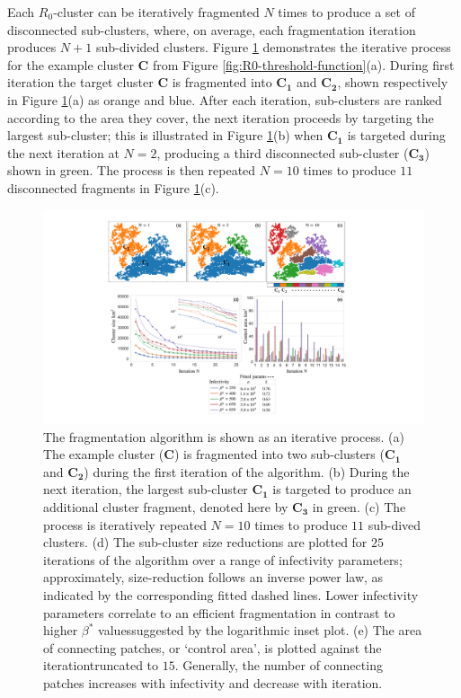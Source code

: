 Each $R_0$-cluster can be iteratively fragmented $N$ times to produce a set of disconnected sub-clusters, 
where, on average, each fragmentation iteration produces $N+1$ sub-divided clusters.
Figure \ref{fig:iterative-fragmentations} demonstrates the iterative process for the example cluster $\mathbf{C}$ from Figure \ref{fig:R0-threshold-function}(a).
During first iteration the target cluster $\mathbf{C}$ is fragmented into $\mathbf{C_1}$ and $\mathbf{C_2}$, shown respectively in Figure \ref{fig:iterative-fragmentations}(a) as orange and blue.
After each iteration, sub-clusters are ranked according to the area they cover, the next iteration proceeds by targeting the largest sub-cluster;
this is illustrated in Figure \ref{fig:iterative-fragmentations}(b) when $\mathbf{C_1}$ is targeted during the next iteration at $N=2$, producing a third disconnected sub-cluster ($\mathbf{C_3}$) shown in green. 
The process is then repeated $N=10$ times to produce $11$ disconnected fragments in Figure \ref{fig:iterative-fragmentations}(c).

\begin{figure}
    \centering
    \includegraphics[scale=0.41]{chapter7/figures/figure2-Iiterative-frag.pdf}
    \caption{
    The fragmentation algorithm is shown as an iterative process. 
    (a) The example cluster ($\mathbf{C}$) is fragmented into two sub-clusters ($\mathbf{C_1}$ and $\mathbf{C_2}$) during the first iteration of the algorithm.
    (b) During the next iteration, the largest sub-cluster $\mathbf{C_1}$ is targeted to produce an additional cluster fragment, denoted here by $\mathbf{C_3}$ in green.
    (c) The process is iteratively repeated $N=10$ times to produce $11$ sub-dived clusters.
    (d) The sub-cluster size reductions are plotted for $25$ iterations of the algorithm over a range of infectivity parameters;  
    approximately, size-reduction follows an inverse power law, as indicated by the corresponding fitted dashed lines.
    Lower infectivity parameters correlate to an efficient fragmentation in contrast to higher $\beta^*$ values\textemdash suggested by the logarithmic inset plot.
    (e) The area of connecting patches, or `control area', is plotted against the iteration\textemdash truncated to $15$. 
    Generally, the number of connecting patches increases with infectivity and decrease with iteration.
    }
    \label{fig:iterative-fragmentations}
\end{figure}

